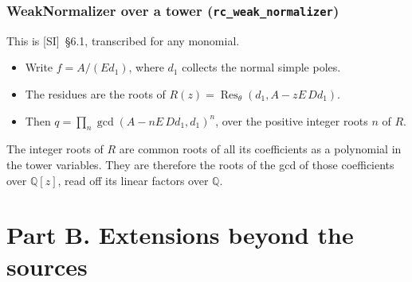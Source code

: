 \documentclass[11pt]{article}
\theoremstyle{definition}
\theoremstyle{remark}
\newcommand{\Q}{\mathbb{Q}}
\newcommand{\code}[1]{\texttt{#1}}
\begin{document}
\section{WeakNormalizer over a tower (\code{rc\_weak\_normalizer})}

This is [SI]~\S6.1, transcribed for any monomial.
\begin{itemize}
\item Write $f=A/(E d_1)$, where $d_1$ collects the normal simple poles.
\item The residues are the roots of $R(z)=\operatorname{Res}_\theta(d_1,A-zE\,Dd_1)$.
\item Then $q=\prod_n\gcd(A-nE\,Dd_1,d_1)^n$, over the positive integer roots $n$
  of $R$.
\end{itemize}
The integer roots of $R$ are common roots of all its coefficients as a
polynomial in the tower variables. They are therefore the roots of the gcd of
those coefficients over $\Q[z]$, read off its linear factors over $\Q$.

\part*{Part B. Extensions beyond the sources}
\end{document}
